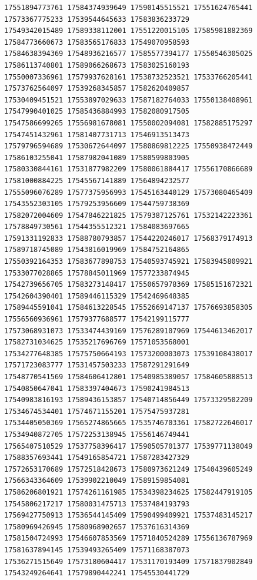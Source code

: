 \documentclass[9pt]{article}
\begin{document}
\begin{verbatim}
17551894773761 17584374939649 17590145515521 17551624765441 17573367775233 17539544645633 17583836233729
17549342015489 17589338112001 17551220015105 17585981882369 17584773660673 17583565176833 17549070958593
17584638394369 17548936216577 17585577394177 17550546305025 17586113740801 17589066268673 17583025160193
17550007336961 17579937628161 17538732523521 17533766205441 17573762564097 17539268345857 17582620409857
17530409451521 17553897029633 17587182764033 17550138408961 17547990401025 17585436884993 17582080917505
17547586699265 17556981678081 17550002094081 17582885175297 17547451432961 17581407731713 17546913513473
17579796594689 17530672644097 17580869812225 17550938472449 17586103255041 17587982041089 17580599803905
17580330844161 17531877982209 17580061884417 17556170866689 17581000884225 17545567141889 17564894232577
17555096076289 17577375956993 17545163440129 17573080465409 17543552303105 17579253956609 17544759738369
17582072004609 17547846221825 17579387125761 17532142223361 17578849730561 17544355512321 17584083697665
17591331192833 17588780793857 17544220246017 17568379174913 17589718745089 17543816019969 17584752164865
17550392164353 17583677898753 17540593745921 17583945809921 17533077028865 17578845011969 17577233874945
17542739656705 17583273148417 17550657978369 17585151672321 17542604390401 17589446115329 17542469648385
17589445591041 17584613228545 17552669147137 17576693858305 17556560936961 17579377688577 17542199115777
17573068931073 17533474439169 17576289107969 17544613462017 17582731034625 17535217696769 17571053568001
17534277648385 17575750664193 17573200003073 17539108438017 17571723083777 17531457503233 17587291291649
17548770541569 17584606412801 17540985389057 17584605888513 17540850647041 17583397404673 17590241984513
17540983816193 17589436153857 17540714856449 17573329502209 17534674534401 17574671155201 17575475937281
17534405050369 17565274865665 17535746703361 17582722646017 17534940872705 17572253138945 17556146749441
17565407510529 17537758396417 17590505701377 17539771138049 17588357693441 17549165854721 17587283427329
17572653170689 17572518428673 17580973621249 17540439605249 17566343364609 17539902210049 17589159854081
17586206801921 17574261161985 17534398234625 17582447919105 17545806217217 17580031475713 17537484193793
17569427750913 17536544145409 17590499409921 17537483145217 17580969426945 17580968902657 17537616314369
17581504724993 17546607853569 17571840524289 17556136787969 17581637894145 17539493265409 17571168387073
17536271515649 17573180604417 17531170193409 17571837902849 17543249264641 17579890442241 17545530441729

\end{verbatim}
\end{document}
